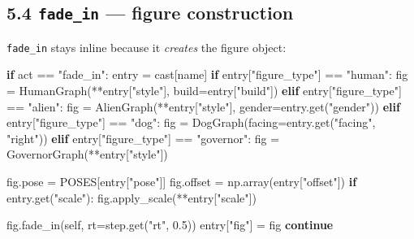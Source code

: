 \documentclass[
  11pt,
]{book}
\newenvironment{Shaded}{}{}
\newcommand{\ControlFlowTok}[1]{\textcolor[rgb]{0.00,0.44,0.13}{\textbf{#1}}}
\newcommand{\FloatTok}[1]{\textcolor[rgb]{0.25,0.63,0.44}{#1}}
\newcommand{\NormalTok}[1]{#1}
\newcommand{\OperatorTok}[1]{\textcolor[rgb]{0.40,0.40,0.40}{#1}}
\newcommand{\StringTok}[1]{\textcolor[rgb]{0.25,0.44,0.63}{#1}}
\newcommand{\VariableTok}[1]{\textcolor[rgb]{0.10,0.09,0.49}{#1}}
\begin{document}
\subsection{\texorpdfstring{5.4 \texttt{fade\_in} --- figure
construction}{5.4 fade\_in --- figure construction}}\label{fade_in-figure-construction}

\texttt{fade\_in} stays inline because it \emph{creates} the figure
object:

\begin{Shaded}
\begin{Highlighting}[]
\ControlFlowTok{if}\NormalTok{ act }\OperatorTok{==} \StringTok{"fade\_in"}\NormalTok{:}
\NormalTok{    entry }\OperatorTok{=}\NormalTok{ cast[name]}
    \ControlFlowTok{if}\NormalTok{ entry[}\StringTok{"figure\_type"}\NormalTok{] }\OperatorTok{==} \StringTok{"human"}\NormalTok{:}
\NormalTok{        fig }\OperatorTok{=}\NormalTok{ HumanGraph(}\OperatorTok{**}\NormalTok{entry[}\StringTok{"style"}\NormalTok{], build}\OperatorTok{=}\NormalTok{entry[}\StringTok{"build"}\NormalTok{])}
    \ControlFlowTok{elif}\NormalTok{ entry[}\StringTok{"figure\_type"}\NormalTok{] }\OperatorTok{==} \StringTok{"alien"}\NormalTok{:}
\NormalTok{        fig }\OperatorTok{=}\NormalTok{ AlienGraph(}\OperatorTok{**}\NormalTok{entry[}\StringTok{"style"}\NormalTok{], gender}\OperatorTok{=}\NormalTok{entry.get(}\StringTok{"gender"}\NormalTok{))}
    \ControlFlowTok{elif}\NormalTok{ entry[}\StringTok{"figure\_type"}\NormalTok{] }\OperatorTok{==} \StringTok{"dog"}\NormalTok{:}
\NormalTok{        fig }\OperatorTok{=}\NormalTok{ DogGraph(facing}\OperatorTok{=}\NormalTok{entry.get(}\StringTok{"facing"}\NormalTok{, }\StringTok{"right"}\NormalTok{))}
    \ControlFlowTok{elif}\NormalTok{ entry[}\StringTok{"figure\_type"}\NormalTok{] }\OperatorTok{==} \StringTok{"governor"}\NormalTok{:}
\NormalTok{        fig }\OperatorTok{=}\NormalTok{ GovernorGraph(}\OperatorTok{**}\NormalTok{entry[}\StringTok{"style"}\NormalTok{])}

\NormalTok{    fig.pose }\OperatorTok{=}\NormalTok{ POSES[entry[}\StringTok{"pose"}\NormalTok{]]}
\NormalTok{    fig.offset }\OperatorTok{=}\NormalTok{ np.array(entry[}\StringTok{"offset"}\NormalTok{])}
    \ControlFlowTok{if}\NormalTok{ entry.get(}\StringTok{"scale"}\NormalTok{):}
\NormalTok{        fig.apply\_scale(}\OperatorTok{**}\NormalTok{entry[}\StringTok{"scale"}\NormalTok{])}

\NormalTok{    fig.fade\_in(}\VariableTok{self}\NormalTok{, rt}\OperatorTok{=}\NormalTok{step.get(}\StringTok{"rt"}\NormalTok{, }\FloatTok{0.5}\NormalTok{))}
\NormalTok{    entry[}\StringTok{"fig"}\NormalTok{] }\OperatorTok{=}\NormalTok{ fig}
    \ControlFlowTok{continue}
\end{Highlighting}
\end{Shaded}
\end{document}

